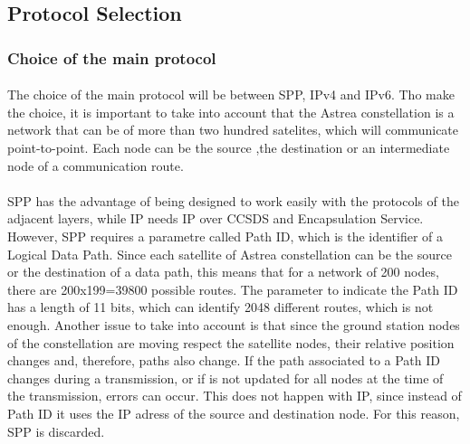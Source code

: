 \subsection{Protocol Selection}

\subsubsection{Choice of the main protocol}
\paragraph{}The choice of the main protocol will be between SPP, IPv4 and IPv6. Tho make the choice, it is important to take into account that the Astrea constellation is a network that can be of more than two hundred satelites, which will communicate point-to-point. Each node can be the source ,the destination or an intermediate node of a communication route.
\paragraph{}SPP has the advantage of being designed to work easily with the protocols of the adjacent layers, while IP needs IP over CCSDS and Encapsulation Service. However, SPP requires a parametre called Path ID, which is the identifier of a Logical Data Path. Since each satellite of Astrea constellation can be the source or the destination of a data path, this means that for a network of 200 nodes, there are 200x199=39800 possible routes. The parameter to indicate the Path ID has a length of 11 bits, which can identify 2048 different routes, which is not enough. Another issue to take into account is that since the ground station nodes of the constellation are moving respect the satellite nodes, their relative position changes and, therefore, paths also change. If the path associated to a Path ID changes during a transmission, or if is not updated for all nodes at the time of the transmission, errors can occur. This does not happen with IP, since instead of Path ID it uses the IP adress of the source and destination node. For this reason, SPP is discarded.
